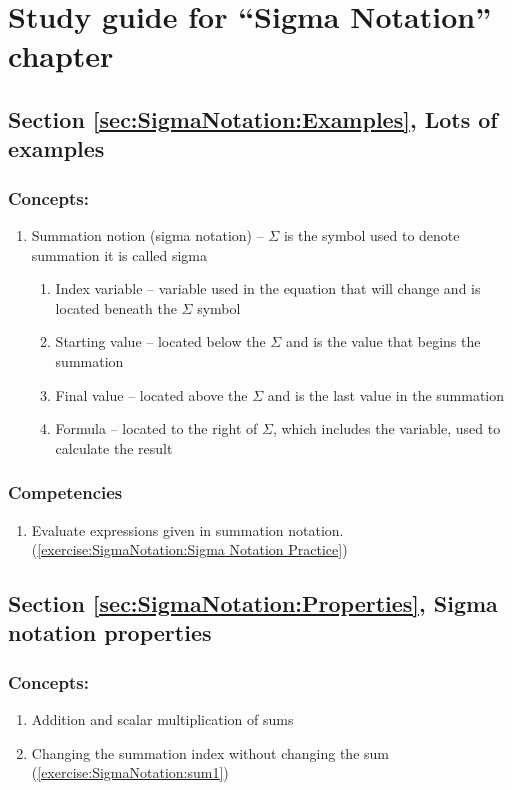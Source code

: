\section{Study guide  for ``Sigma Notation''  chapter}
\label{sec:SigmaNotation:StudyGuide} 
\subsection*{Section \ref{sec:SigmaNotation:Examples}, Lots of examples}
\subsubsection*{Concepts:}
\begin{enumerate}
\item 
Summation notion (sigma notation) -- $\Sigma$ is the symbol used to denote summation it is called sigma
\begin{enumerate}
\item
Index variable -- variable used in the equation that will change and is located beneath the $\Sigma$ symbol
\item
Starting value -- located below the $\Sigma$ and is the value that begins the summation
\item
Final value -- located above the $\Sigma$ and is the last value in the summation
\item
Formula -- located to the right of $\Sigma$, which includes the variable, used to calculate the result
\end{enumerate}
\end{enumerate}

\subsubsection*{Competencies}
\begin{enumerate}
\item
Evaluate expressions given in summation notation. (\ref{exercise:SigmaNotation:Sigma Notation Practice})
\end{enumerate}


\subsection*{Section \ref{sec:SigmaNotation:Properties}, Sigma notation properties}
\subsubsection*{Concepts:}
\begin{enumerate}
\item 
Addition and scalar multiplication of sums
\item
Changing the summation index without changing the sum (\ref{exercise:SigmaNotation:sum1})
\end{enumerate}

